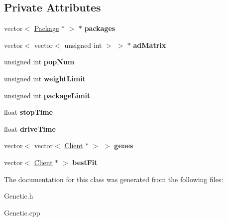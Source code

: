 \subsection*{Private Attributes}
\begin{DoxyCompactItemize}
\item 
vector$<$ \hyperlink{classPackage}{Package} $\ast$ $>$ $\ast$ {\bfseries packages}\hypertarget{classGenetic_a5e98b22c206236130ab041dc7a8221b3}{}\label{classGenetic_a5e98b22c206236130ab041dc7a8221b3}

\item 
vector$<$ vector$<$ unsigned int $>$ $>$ $\ast$ {\bfseries ad\+Matrix}\hypertarget{classGenetic_a2941366d1afb2f0d9256909ca30a601f}{}\label{classGenetic_a2941366d1afb2f0d9256909ca30a601f}

\item 
unsigned int {\bfseries pop\+Num}\hypertarget{classGenetic_a644a04082c893bfecba4b60e6c881dcd}{}\label{classGenetic_a644a04082c893bfecba4b60e6c881dcd}

\item 
unsigned int {\bfseries weight\+Limit}\hypertarget{classGenetic_a4545405d58dd365147d709dcc4e7bb0a}{}\label{classGenetic_a4545405d58dd365147d709dcc4e7bb0a}

\item 
unsigned int {\bfseries package\+Limit}\hypertarget{classGenetic_a0360729e64ff5021ceae7019c44feee4}{}\label{classGenetic_a0360729e64ff5021ceae7019c44feee4}

\item 
float {\bfseries stop\+Time}\hypertarget{classGenetic_a52276cb3e4b3e5c5423c9747a3ea5631}{}\label{classGenetic_a52276cb3e4b3e5c5423c9747a3ea5631}

\item 
float {\bfseries drive\+Time}\hypertarget{classGenetic_a060cb30bbd912dd78fbf567410746631}{}\label{classGenetic_a060cb30bbd912dd78fbf567410746631}

\item 
vector$<$ vector$<$ \hyperlink{classClient}{Client} $\ast$ $>$ $>$ {\bfseries genes}\hypertarget{classGenetic_a534fa331449d7b496e799bd2b505eea6}{}\label{classGenetic_a534fa331449d7b496e799bd2b505eea6}

\item 
vector$<$ \hyperlink{classClient}{Client} $\ast$ $>$ {\bfseries best\+Fit}\hypertarget{classGenetic_a3024d7bb48ec1034f5baa753dfcf1597}{}\label{classGenetic_a3024d7bb48ec1034f5baa753dfcf1597}

\end{DoxyCompactItemize}


The documentation for this class was generated from the following files\+:\begin{DoxyCompactItemize}
\item 
Genetic.\+h\item 
Genetic.\+cpp\end{DoxyCompactItemize}
